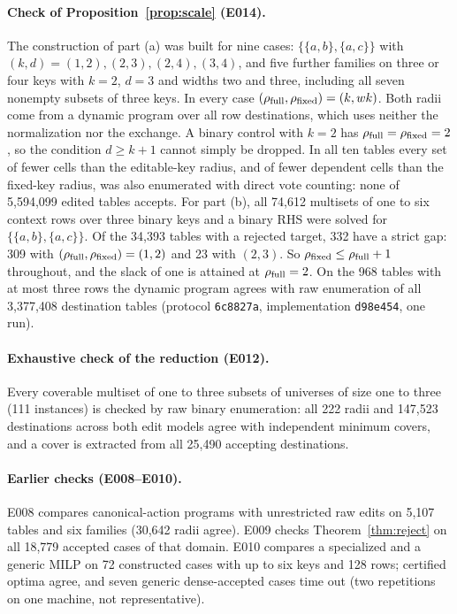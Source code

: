\documentclass[11pt]{article}
\theoremstyle{remark}
\newcommand{\rfull}{\rho_{\rm full}}
\newcommand{\rfix}{\rho_{\rm fixed}}
\begin{document}
\paragraph{Check of Proposition~\ref{prop:scale} (E014).}
The construction of part (a) was built for nine cases: $\{\{a,b\},\{a,c\}\}$
with $(k,d)=(1,2),(2,3),(2,4),(3,4)$, and five further families on three or
four keys with $k=2$, $d=3$ and widths two and three, including all seven
nonempty subsets of three keys. In every case $(\rfull,\rfix)=(k,wk)$. Both
radii come from a dynamic program over all row destinations, which uses neither
the normalization nor the exchange. A binary control with $k=2$ has
$\rfull=\rfix=2$, so the condition $d\ge k+1$ cannot simply be dropped. In all
ten tables every set of fewer cells than the editable-key radius, and of fewer
dependent cells than the fixed-key radius, was also enumerated with direct vote
counting: none of 5,594,099 edited tables accepts. For part (b), all 74,612
multisets of one to six context rows over three binary keys and a binary RHS
were solved for $\{\{a,b\},\{a,c\}\}$. Of the 34,393 tables with a rejected
target, 332 have a strict gap: 309 with $(\rfull,\rfix)=(1,2)$ and 23 with
$(2,3)$. So $\rfix\le\rfull+1$ throughout, and the slack of one is attained at
$\rfull=2$. On the 968 tables with at most three rows the dynamic program
agrees with raw enumeration of all 3,377,408 destination tables (protocol
\texttt{6c8827a}, implementation \texttt{d98e454}, one run).

\paragraph{Exhaustive check of the reduction (E012).}
Every coverable multiset of one to three subsets of universes of size one to
three (111 instances) is checked by raw binary enumeration: all 222 radii and
147,523 destinations across both edit models agree with independent minimum
covers, and a cover is extracted from all 25,490 accepting destinations.

\paragraph{Earlier checks (E008--E010).}
E008 compares canonical-action programs with unrestricted raw edits on 5,107
tables and six families (30,642 radii agree). E009 checks
Theorem~\ref{thm:reject} on all 18,779 accepted cases of that domain. E010
compares a specialized and a generic MILP on 72 constructed cases with up to
six keys and 128 rows; certified optima agree, and seven generic dense-accepted
cases time out (two repetitions on one machine, not representative).
\end{document}
